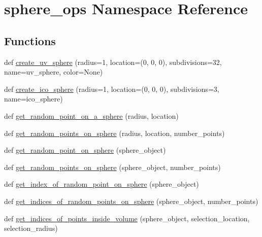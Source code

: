 \hypertarget{namespacesphere__ops}{}\section{sphere\+\_\+ops Namespace Reference}
\label{namespacesphere__ops}
\subsection*{Functions}
\begin{DoxyCompactItemize}
\item 
def \hyperlink{namespacesphere__ops_a2838a84c9d594fcd12b844cfc93e2f40}{create\+\_\+uv\+\_\+sphere} (radius=1, location=(0, 0, 0), subdivisions=32, name=\textquotesingle{}uv\+\_\+sphere\textquotesingle{}, color=None)
\item 
def \hyperlink{namespacesphere__ops_a1f6df5b18141b3ccc981bf8cfbc0ad9d}{create\+\_\+ico\+\_\+sphere} (radius=1, location=(0, 0, 0), subdivisions=3, name=\textquotesingle{}ico\+\_\+sphere\textquotesingle{})
\item 
def \hyperlink{namespacesphere__ops_a8293b8662c8f3c34f27ef916dc1379da}{get\+\_\+random\+\_\+point\+\_\+on\+\_\+a\+\_\+sphere} (radius, location)
\item 
def \hyperlink{namespacesphere__ops_a7b82b0d4d7eda2e1fbe328ccc5f758db}{get\+\_\+random\+\_\+points\+\_\+on\+\_\+sphere} (radius, location, number\+\_\+points)
\item 
def \hyperlink{namespacesphere__ops_a53d08f0c49a89f71398b69bf058afcb7}{get\+\_\+random\+\_\+point\+\_\+on\+\_\+sphere} (sphere\+\_\+object)
\item 
def \hyperlink{namespacesphere__ops_acc4e8a91e2c5dc0942ea5869130a0b8e}{get\+\_\+random\+\_\+points\+\_\+on\+\_\+sphere} (sphere\+\_\+object, number\+\_\+points)
\item 
def \hyperlink{namespacesphere__ops_a2968d1c98647175c24ce69c9b403d834}{get\+\_\+index\+\_\+of\+\_\+random\+\_\+point\+\_\+on\+\_\+sphere} (sphere\+\_\+object)
\item 
def \hyperlink{namespacesphere__ops_a6203f3e541608c7cbb78f200698fb2b4}{get\+\_\+indices\+\_\+of\+\_\+random\+\_\+points\+\_\+on\+\_\+sphere} (sphere\+\_\+object, number\+\_\+points)
\item 
def \hyperlink{namespacesphere__ops_ab55273c73434d17ca71d525c89f9347a}{get\+\_\+indices\+\_\+of\+\_\+points\+\_\+inside\+\_\+volume} (sphere\+\_\+object, selection\+\_\+location, selection\+\_\+radius)
\item 

\end{DoxyCompactItemize}

